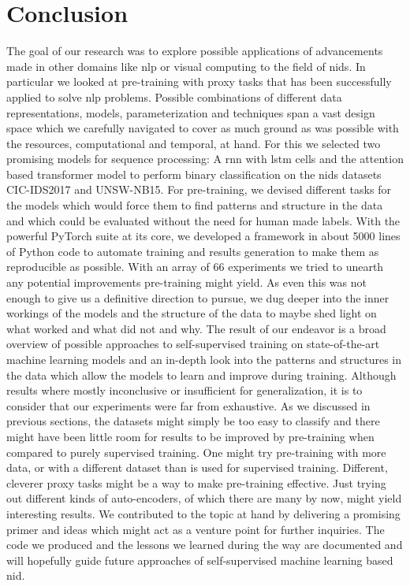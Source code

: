 \chapter{Conclusion} \label{sec:conclusion}

The goal of our research was to explore possible applications of advancements made in other domains like \gls{nlp} or visual computing to the field of \gls{nids}. In particular we looked at pre-training with proxy tasks that has been successfully applied to solve \gls{nlp} problems. Possible combinations of different data representations, models, parameterization and techniques span a vast design space which we carefully navigated to cover as much ground as was possible with the resources, computational and temporal, at hand. For this we selected two promising models for sequence processing: A \gls{rnn} with \gls{lstm} cells and the attention based transformer model to perform binary classification on the \gls{nids} datasets CIC-IDS2017 and UNSW-NB15. For pre-training, we devised different tasks for the models which would force them to find patterns and structure in the data and which could be evaluated without the need for human made labels. With the powerful PyTorch suite at its core, we developed a framework in about 5000 lines of Python code to automate training and results generation to make them as reproducible as possible. With an array of 66 experiments we tried to unearth any potential improvements pre-training might yield. As even this was not enough to give us a definitive direction to pursue, we dug deeper into the inner workings of the models and the structure of the data to maybe shed light on what worked and what did not and why. The result of our endeavor is a broad overview of possible approaches to self-supervised training on state-of-the-art machine learning models and an in-depth look into the patterns and structures in the data which allow the models to learn and improve during training. Although results where mostly inconclusive or insufficient for generalization, it is to consider that our experiments were far from exhaustive. As we discussed in previous sections, the datasets might simply be too easy to classify and there might have been little room for results to be improved by pre-training when compared to purely supervised training. One might try pre-training with more data, or with a different dataset than is used for supervised training. Different, cleverer proxy tasks might be a way to make pre-training effective. Just trying out different kinds of auto-encoders, of which there are many by now, might yield interesting results. We contributed to the topic at hand by delivering a promising primer and ideas which might act as a venture point for further inquiries. The code we produced and the lessons we learned during the way are documented and will hopefully guide future approaches of self-supervised machine learning based \gls{nid}.

\newpage